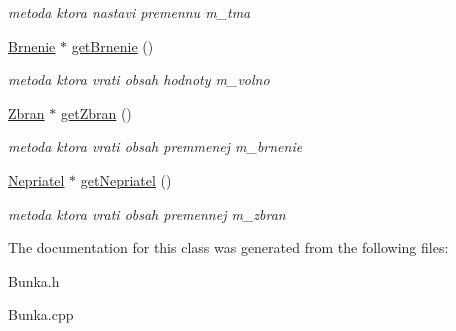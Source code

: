 \begin{DoxyCompactItemize}
\begin{DoxyCompactList}\small\item\em metoda ktora nastavi premennu m\-\_\-tma \end{DoxyCompactList}\item 
\hypertarget{class_bunka_abc925c9c2dd9029f31a64ed54c59377f}{\hyperlink{class_brnenie}{Brnenie} $\ast$ \hyperlink{class_bunka_abc925c9c2dd9029f31a64ed54c59377f}{get\-Brnenie} ()}\label{class_bunka_abc925c9c2dd9029f31a64ed54c59377f}

\begin{DoxyCompactList}\small\item\em metoda ktora vrati obsah hodnoty m\-\_\-volno \end{DoxyCompactList}\item 
\hypertarget{class_bunka_a6b241bae5b391e76ba00ed250dd61d2c}{\hyperlink{class_zbran}{Zbran} $\ast$ \hyperlink{class_bunka_a6b241bae5b391e76ba00ed250dd61d2c}{get\-Zbran} ()}\label{class_bunka_a6b241bae5b391e76ba00ed250dd61d2c}

\begin{DoxyCompactList}\small\item\em metoda ktora vrati obsah premmenej m\-\_\-brnenie \end{DoxyCompactList}\item 
\hypertarget{class_bunka_a81cf6cc8e4809fcdfa2b3b3bfeea4d79}{\hyperlink{class_nepriatel}{Nepriatel} $\ast$ \hyperlink{class_bunka_a81cf6cc8e4809fcdfa2b3b3bfeea4d79}{get\-Nepriatel} ()}\label{class_bunka_a81cf6cc8e4809fcdfa2b3b3bfeea4d79}

\begin{DoxyCompactList}\small\item\em metoda ktora vrati obsah premennej m\-\_\-zbran \end{DoxyCompactList}\end{DoxyCompactItemize}


The documentation for this class was generated from the following files\-:\begin{DoxyCompactItemize}
\item 
Bunka.\-h\item 
Bunka.\-cpp\end{DoxyCompactItemize}
